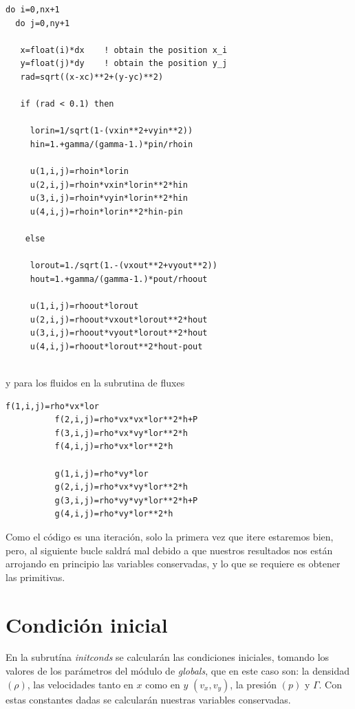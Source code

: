 \documentclass[12pt,a4paper]{book}
\begin{document}
\begin{lstlisting}[frame=single] 
do i=0,nx+1
  do j=0,ny+1
   
   x=float(i)*dx 	! obtain the position x_i
   y=float(j)*dy 	! obtain the position y_j
   rad=sqrt((x-xc)**2+(y-yc)**2)
   
   if (rad < 0.1) then
   
     lorin=1/sqrt(1-(vxin**2+vyin**2))
     hin=1.+gamma/(gamma-1.)*pin/rhoin
           
     u(1,i,j)=rhoin*lorin
     u(2,i,j)=rhoin*vxin*lorin**2*hin
     u(3,i,j)=rhoin*vyin*lorin**2*hin
     u(4,i,j)=rhoin*lorin**2*hin-pin
    
    else
    
     lorout=1./sqrt(1.-(vxout**2+vyout**2))
     hout=1.+gamma/(gamma-1.)*pout/rhoout
     
     u(1,i,j)=rhoout*lorout
     u(2,i,j)=rhoout*vxout*lorout**2*hout
     u(3,i,j)=rhoout*vyout*lorout**2*hout
     u(4,i,j)=rhoout*lorout**2*hout-pout
     

\end{lstlisting}
y para los fluidos en la subrutina de fluxes
\begin{lstlisting}[frame=single]
          f(1,i,j)=rho*vx*lor
          f(2,i,j)=rho*vx*vx*lor**2*h+P
          f(3,i,j)=rho*vx*vy*lor**2*h
          f(4,i,j)=rho*vx*lor**2*h

          g(1,i,j)=rho*vy*lor
          g(2,i,j)=rho*vx*vy*lor**2*h
          g(3,i,j)=rho*vy*vy*lor**2*h+P
          g(4,i,j)=rho*vy*lor**2*h
\end{lstlisting}
Como el código es una iteración, solo la primera vez que itere estaremos bien, pero, al siguiente bucle saldrá mal debido a que nuestros resultados nos están arrojando en principio las variables conservadas, y lo que se requiere es obtener las primitivas.

\section{Condición inicial}
En la subrutína \textit{initconds} se calcularán las condiciones iniciales, tomando los valores de los parámetros del módulo de \textit{globals}, que en este caso son: la densidad $(\rho)$, las velocidades tanto en $x$ como en $y$ $(v_x, v_y)$, la presión $(p)$ y $\Gamma$. Con estas constantes dadas se calcularán nuestras variables conservadas.
\end{document}
